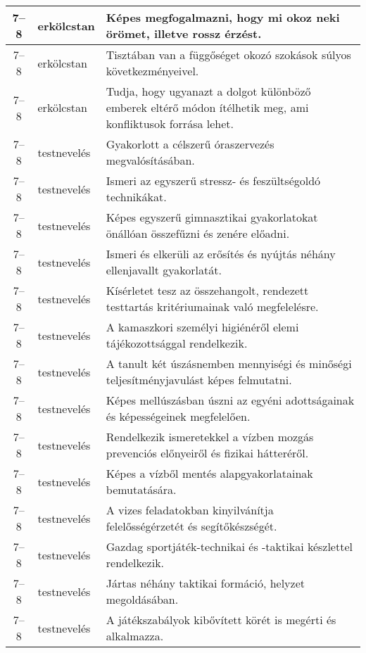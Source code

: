 \begin{small}
\begin{longtable}{c | p{2cm} |  p{11cm} }
              7--8 & erkölcstan & Képes megfogalmazni, hogy mi okoz neki örömet, illetve rossz érzést. \\ \hline
              7--8 & erkölcstan & Tisztában van a függőséget okozó szokások súlyos következményeivel. \\ \hline
              7--8 & erkölcstan & Tudja, hogy ugyanazt a dolgot különböző emberek eltérő módon ítélhetik meg, ami konfliktusok forrása lehet. \\ \hline
              7--8 & testnevelés & Gyakorlott a célszerű óraszervezés megvalósításában. \\ \hline
              7--8 & testnevelés & Ismeri az egyszerű stressz- és feszültségoldó technikákat. \\ \hline
              7--8 & testnevelés & Képes egyszerű gimnasztikai gyakorlatokat önállóan összefűzni és zenére előadni. \\ \hline
              7--8 & testnevelés & Ismeri és elkerüli az erősítés és nyújtás néhány ellenjavallt gyakorlatát. \\ \hline
              7--8 & testnevelés & Kísérletet tesz az összehangolt, rendezett testtartás kritériumainak való megfelelésre. \\ \hline
              7--8 & testnevelés & A kamaszkori személyi higiénéről elemi tájékozottsággal rendelkezik. \\ \hline
              7--8 & testnevelés & A tanult két úszásnemben mennyiségi és minőségi teljesítményjavulást képes felmutatni. \\ \hline
              7--8 & testnevelés & Képes mellúszásban úszni az egyéni adottságainak és képességeinek megfelelően. \\ \hline
              7--8 & testnevelés & Rendelkezik ismeretekkel a vízben mozgás prevenciós előnyeiről és fizikai hátteréről. \\ \hline
              7--8 & testnevelés & Képes a vízből mentés alapgyakorlatainak bemutatására. \\ \hline
              7--8 & testnevelés & A vizes feladatokban kinyilvánítja felelősségérzetét és segítőkészségét. \\ \hline
              7--8 & testnevelés & Gazdag sportjáték-technikai és -taktikai készlettel rendelkezik. \\ \hline
              7--8 & testnevelés & Jártas néhány taktikai formáció, helyzet megoldásában. \\ \hline
              7--8 & testnevelés & A játékszabályok kibővített körét is megérti és alkalmazza. \\ \hline

\end{longtable}
\end{small}
